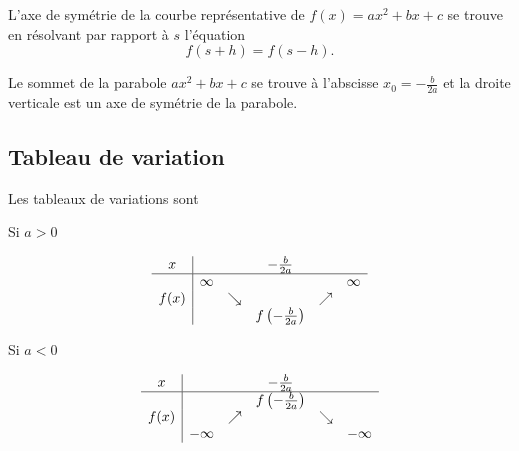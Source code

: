 L'axe de symétrie de la courbe représentative de \( f(x)=ax^2+bx+c\) se trouve en résolvant par rapport à \( s\) l'équation
\begin{equation}
    f(s+h)=f(s-h).
\end{equation}

\begin{Aretenir}
    Le sommet de la parabole \( ax^2+bx+c\) se trouve à l'abscisse \( x_0=-\frac{ b }{ 2a }\) et la droite verticale est un axe de symétrie de la parabole.
\end{Aretenir}

\subsection{Tableau de variation}

Les tableaux de variations sont
\begin{multicols}{2}

    \begin{center}
        Si \( a>0\)

        \begin{equation*}
            \begin{array}[]{c|ccccc}
                x&&&-\frac{ b }{ 2a }&&\\
                \hline
                &\infty&&&&\infty\\
                f(x)&&\searrow&&\nearrow&\\
                &&&f\left( -\frac{ b }{ 2a } \right)&&\\
            \end{array}
        \end{equation*}
        
    \end{center}

    \columnbreak

    \begin{center}
        Si \( a<0\)


        \begin{equation*}
            \begin{array}[]{c|ccccc}
                x&&&-\frac{ b }{ 2a }&&\\
                \hline
                &&&f\left( -\frac{ b }{ 2a } \right)&&\\
                f(x)&&\nearrow&&\searrow&\\
                &-\infty&&&&-\infty\\
            \end{array}
        \end{equation*}
    \end{center}
\end{multicols}

